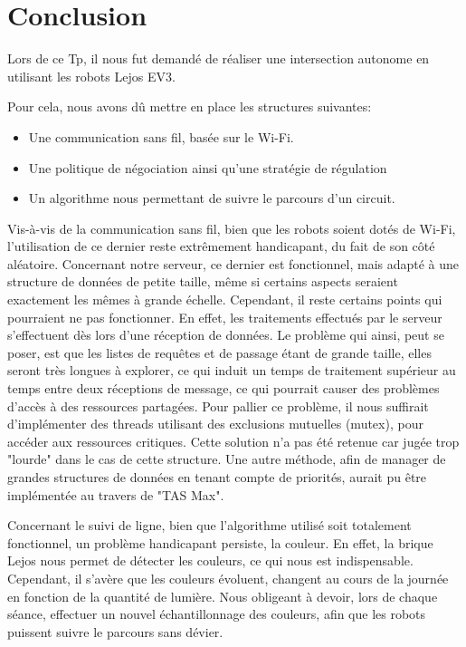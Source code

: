 \documentclass[french,a4paper,12pt]{report}
\begin{document}
\section{Conclusion}
Lors de ce Tp, il nous fut demandé de réaliser une intersection autonome en utilisant les robots Lejos EV3.

Pour cela, nous avons dû mettre en place les structures suivantes:
\begin{itemize}
\item Une communication sans fil, basée sur le Wi-Fi.

\item Une politique de négociation ainsi qu'une stratégie de régulation

\item Un algorithme nous permettant de suivre le parcours d'un circuit.
\end{itemize}

Vis-à-vis de la communication sans fil, bien que les robots soient dotés de Wi-Fi, l'utilisation de ce dernier reste extrêmement handicapant, du fait de son côté aléatoire.
Concernant notre serveur, ce dernier est fonctionnel, mais adapté à une structure de données de petite taille, même si certains aspects seraient exactement les mêmes à grande échelle. Cependant, il reste certains points qui pourraient ne pas fonctionner. 
En effet, les traitements effectués par le serveur s'effectuent dès lors d'une réception de données. Le problème qui ainsi, peut se poser, est que les listes de requêtes et de passage étant de grande taille, elles seront très longues à explorer, ce qui induit un temps de traitement supérieur au temps entre deux réceptions de message, ce qui pourrait causer des problèmes d'accès à des ressources partagées.
Pour pallier ce problème, il nous suffirait d’implémenter des threads utilisant des exclusions mutuelles (mutex), pour accéder aux ressources critiques. Cette solution n’a pas été retenue car jugée trop "lourde" dans le cas de cette structure.
Une autre méthode, afin de manager de grandes structures de données en tenant compte de priorités, aurait pu être implémentée au travers de "TAS Max".

Concernant le suivi de ligne, bien que l'algorithme utilisé soit totalement fonctionnel, un problème handicapant persiste, la couleur. En effet, la brique Lejos nous permet de détecter les couleurs, ce qui nous est indispensable. Cependant, il s'avère que les couleurs évoluent, changent au cours de la journée en fonction de la quantité de lumière. Nous obligeant à devoir, lors de chaque séance, effectuer un nouvel échantillonnage des couleurs, afin que les robots puissent suivre le parcours sans dévier.
\end{document}
